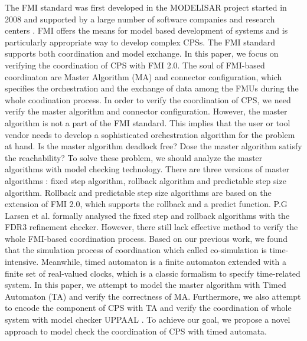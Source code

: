 The FMI standard was first developed in the MODELISAR project started in 2008 and supported by a large number of software companies and research centers \cite{ClauMODELISAR}. FMI offers the means for model based development of systems and is particularly appropriate way to develop complex CPSs. The FMI standard supports both coordination and  model exchange. In this paper, we focus on verifying the coordination of CPS with FMI 2.0.
The soul of FMI-based coordinaton are Master Algorithm (MA) \cite{AckerDVM15} and connector configuration, which specifies the orchestration and the exchange of data among the FMUs during the whole coodination process. In order to verify the coordination of CPS, we need verify the master algorithm and connector configuration. However, the master algorithm is not a part of the FMI standard. This implies that the user or tool vendor needs to develop a sophisticated orchestration algorithm for the problem at hand. Is the master algorithm deadlock free?
Dose the master algorithm satisfy the reachability? To solve these problem, we should analyze the master algorithms with model checking technology. There are three versions of master algorithms \cite{BromanBGLMTW13}: fixed step algorithm, rollback algorithm and predictable step size algorithm. Rollback and predictable step size algorithms are based on the extension of FMI 2.0, which supports the rollback and a predict function. P.G Larsen et al. \cite{Larsen2016Integrated} formally analysed the fixed step and rollback algorithms with the FDR3 refinement checker. However, there still lack effective method to verify the whole FMI-based coordination process. Based on our previous work, we found that the simulation process of coordination which called co-simulation is time-intensive. Meanwhile, timed automaton is a finite automaton extended with a finite set of real-valued clocks, which is a classic formalism to specify time-related system. In this paper, we attempt to model the master algorithm with Timed Automaton (TA) and verify the correctness of MA.  Furthermore, we also attempt to encode the component of CPS with TA and verify the coordination of whole system with model checker UPPAAL \cite{BehrmannDLHPYH06}. To achieve our goal, we propose a novel approach to model check the coordination of CPS with timed automata.

